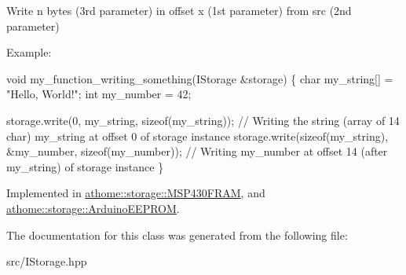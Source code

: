 Write n bytes (3rd parameter) in offset x (1st parameter) from src (2nd parameter)

Example\+:


\begin{DoxyCode}
\textcolor{keywordtype}{void} my\_function\_writing\_something(IStorage &storage) \{
  \textcolor{keywordtype}{char} my\_string[] = \textcolor{stringliteral}{"Hello, World!"};
  \textcolor{keywordtype}{int} my\_number = 42;

  storage.write(0, my\_string, \textcolor{keyword}{sizeof}(my\_string)); \textcolor{comment}{// Writing the string}
(array of 14 char) my\_string at offset 0 of storage instance
  storage.write(\textcolor{keyword}{sizeof}(my\_string), &my\_number, \textcolor{keyword}{sizeof}(my\_number)); \textcolor{comment}{//}
Writing my\_number at offset 14 (after my\_string) of storage instance
\}
\end{DoxyCode}
 

Implemented in \mbox{\hyperlink{classathome_1_1storage_1_1_m_s_p430_f_r_a_m_ae6b7a6d178233f9e54394360b34c3bca}{athome\+::storage\+::\+M\+S\+P430\+F\+R\+AM}}, and \mbox{\hyperlink{classathome_1_1storage_1_1_arduino_e_e_p_r_o_m_a20027ab8a5b20c1fad3e3e42daafe53d}{athome\+::storage\+::\+Arduino\+E\+E\+P\+R\+OM}}.



The documentation for this class was generated from the following file\+:\begin{DoxyCompactItemize}
\item 
src/I\+Storage.\+hpp\end{DoxyCompactItemize}
